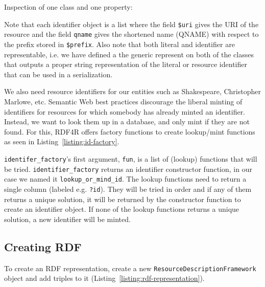

Inspection of one class and one property:



Note that each identifier object is a list where the field {\tt \$uri} gives the URI of the resource and the field {\tt qname} gives the shortened name (QNAME) with respect to the prefix stored in {\tt \$prefix}. Also note that both literal and identifier are representable, i.e. we have defined a the generic represent on both of the classes that outputs a proper string representation of the literal or resource identifier that can be used in a serialization.

We also need resource identifiers for our entities such as Shakespeare, Christopher Marlowe, etc. Semantic Web best practices discourage the liberal minting of identifiers for resources for which somebody has already minted an identifier. Instead, we want to look them up in a database, and only mint if they are not found. For this, RDF4R offers factory functions to create lookup/mint functions as seen in Listing~\ref{listing:id-factory}.



{\tt identifer\_factory}'s first argument, {\tt fun}, is a list of (lookup) functions that will be tried. {\tt identifier\_factory} returns an identifier constructor function, in our case we named it {\tt lookup\_or\_mind\_id}. The lookup functions need to return a single column (labeled e.g. {\tt ?id}). They will be tried in order and if any of them returns a unique solution, it will be returned by the constructor function to create an identifier object. If none of the lookup functions returns a unique solution, a new identifier will be minted. 

\subsection{Creating RDF}

To create an RDF representation, create a new {\tt ResourceDescriptionFramework} object and add triples to it (Listing~\ref{listing:rdf-representation}).

